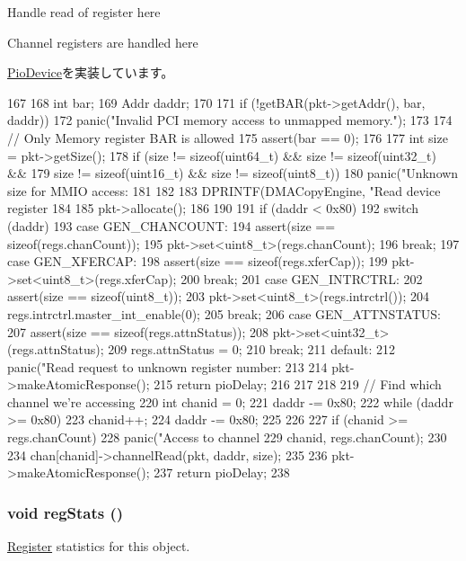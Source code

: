 Handle read of register here

Channel registers are handled here

\hyperlink{classPioDevice_a842312590432036092c422c87a442358}{PioDevice}を実装しています。


\begin{DoxyCode}
167 {
168     int bar;
169     Addr daddr;
170 
171     if (!getBAR(pkt->getAddr(), bar, daddr))
172         panic("Invalid PCI memory access to unmapped memory.\n");
173 
174     // Only Memory register BAR is allowed
175     assert(bar == 0);
176 
177     int size = pkt->getSize();
178     if (size != sizeof(uint64_t) && size != sizeof(uint32_t) &&
179         size != sizeof(uint16_t) && size != sizeof(uint8_t)) {
180         panic("Unknown size for MMIO access: %
181     }
182 
183     DPRINTF(DMACopyEngine, "Read device register %
184 
185     pkt->allocate();
186 
190 
191     if (daddr < 0x80) {
192         switch (daddr) {
193           case GEN_CHANCOUNT:
194             assert(size == sizeof(regs.chanCount));
195             pkt->set<uint8_t>(regs.chanCount);
196             break;
197           case GEN_XFERCAP:
198             assert(size == sizeof(regs.xferCap));
199             pkt->set<uint8_t>(regs.xferCap);
200             break;
201           case GEN_INTRCTRL:
202             assert(size == sizeof(uint8_t));
203             pkt->set<uint8_t>(regs.intrctrl());
204             regs.intrctrl.master_int_enable(0);
205             break;
206           case GEN_ATTNSTATUS:
207             assert(size == sizeof(regs.attnStatus));
208             pkt->set<uint32_t>(regs.attnStatus);
209             regs.attnStatus = 0;
210             break;
211           default:
212             panic("Read request to unknown register number: %
213         }
214         pkt->makeAtomicResponse();
215         return pioDelay;
216     }
217 
218 
219     // Find which channel we're accessing
220     int chanid = 0;
221     daddr -= 0x80;
222     while (daddr >= 0x80) {
223         chanid++;
224         daddr -= 0x80;
225     }
226 
227     if (chanid >= regs.chanCount)
228         panic("Access to channel %
229                 chanid, regs.chanCount);
230 
234     chan[chanid]->channelRead(pkt, daddr, size);
235 
236     pkt->makeAtomicResponse();
237     return pioDelay;
238 }
\end{DoxyCode}
\hypertarget{classCopyEngine_a4dc637449366fcdfc4e764cdf12d9b11}{
\subsubsection[{regStats}]{\setlength{\rightskip}{0pt plus 5cm}void regStats ()}}
\label{classCopyEngine_a4dc637449366fcdfc4e764cdf12d9b11}
\hyperlink{classRegister}{Register} statistics for this object. 

